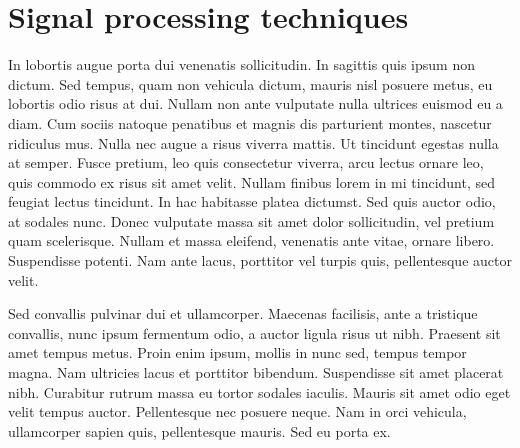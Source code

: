 \section[Signal processing techniques]{Signal processing techniques}
In lobortis augue porta dui venenatis sollicitudin. In sagittis quis ipsum non dictum. Sed tempus, quam non vehicula dictum, mauris nisl posuere metus, eu lobortis odio risus at dui. Nullam non ante vulputate nulla ultrices euismod eu a diam. Cum sociis natoque penatibus et magnis dis parturient montes, nascetur ridiculus mus. Nulla nec augue a risus viverra mattis. Ut tincidunt egestas nulla at semper. Fusce pretium, leo quis consectetur viverra, arcu lectus ornare leo, quis commodo ex risus sit amet velit. Nullam finibus lorem in mi tincidunt, sed feugiat lectus tincidunt. In hac habitasse platea dictumst. Sed quis auctor odio, at sodales nunc. Donec vulputate massa sit amet dolor sollicitudin, vel pretium quam scelerisque. Nullam et massa eleifend, venenatis ante vitae, ornare libero. Suspendisse potenti. Nam ante lacus, porttitor vel turpis quis, pellentesque auctor velit.

Sed convallis pulvinar dui et ullamcorper. Maecenas facilisis, ante a tristique convallis, nunc ipsum fermentum odio, a auctor ligula risus ut nibh. Praesent sit amet tempus metus. Proin enim ipsum, mollis in nunc sed, tempus tempor magna. Nam ultricies lacus et porttitor bibendum. Suspendisse sit amet placerat nibh. Curabitur rutrum massa eu tortor sodales iaculis. Mauris sit amet odio eget velit tempus auctor. Pellentesque nec posuere neque. Nam in orci vehicula, ullamcorper sapien quis, pellentesque mauris. Sed eu porta ex. 
